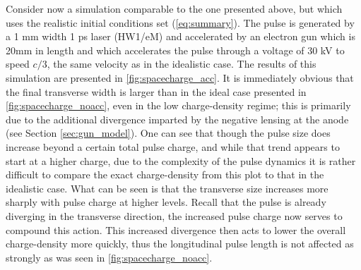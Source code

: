 Consider now a simulation comparable to the one presented above, but which uses the realistic initial conditions set (\ref{eq:summary}).
The pulse is generated by a 1 mm width 1 ps laser (HW1/eM) and accelerated by an electron gun which is 20mm in length and which accelerates the pulse through a voltage of 30 kV to speed $c/3$, the same velocity as in the idealistic case.
The results of this simulation are presented in \ref{fig:spacecharge_acc}.
It is immediately obvious that the final transverse width is larger than in the ideal case presented in \ref{fig:spacecharge_noacc}, even in the low charge-density regime; this is primarily due to the additional divergence imparted by the negative lensing at the anode (see Section \ref{sec:gun_model}).
One can see that though the pulse size does increase beyond a certain total pulse charge, and while that trend appears to start at a higher charge, due to the complexity of the pulse dynamics it is rather difficult to compare the exact charge-density from this plot to that in the idealistic case.
What can be seen is that the transverse size increases more sharply with pulse charge at higher levels.
Recall that the pulse is already diverging in the transverse direction, the increased pulse charge now serves to compound this action.
This increased divergence then acts to lower the overall charge-density more quickly, thus the longitudinal pulse length is not affected as strongly as was seen in \ref{fig:spacecharge_noacc}.


